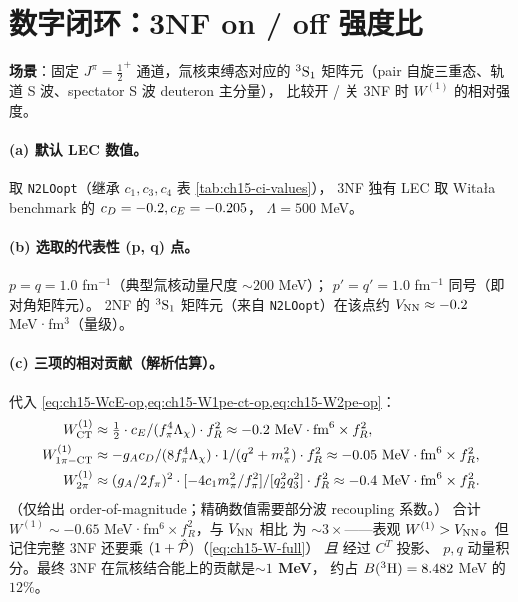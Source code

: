 \section{数字闭环：3NF on / off 强度比}
\label{sec:ch15-numerics}

\begin{numericalbox}[label={box:ch15-numerical-closure}]
\textbf{场景}：固定 \(J^\pi = \tfrac{1}{2}^+\) 通道，氚核束缚态对应的 \({}^3{\rm S}_1\)
矩阵元（pair 自旋三重态、轨道 S 波、spectator S 波 deuteron 主分量），
比较开 / 关 3NF 时 \(W^{(1)}\) 的相对强度。

\paragraph{(a) 默认 LEC 数值。}
取 \texttt{N2LOopt}（继承 \(c_1, c_3, c_4\) 表 \cref{tab:ch15-ci-values}），
3NF 独有 LEC 取 Witała benchmark 的 \(c_D = -0.2, c_E = -0.205\)，
\(\Lambda = 500\) MeV。

\paragraph{(b) 选取的代表性 (p, q) 点。}
\(p = q = 1.0\) fm\(^{-1}\)（典型氚核动量尺度 \(\sim 200\) MeV）；
\(p' = q' = 1.0\) fm\(^{-1}\) 同号（即对角矩阵元）。
2NF 的 \({}^3{\rm S}_1\) 矩阵元（来自 \texttt{N2LOopt}）在该点约
\(V_{\rm NN} \approx -0.2\) MeV·fm\(^3\)（量级）。

\paragraph{(c) 三项的相对贡献（解析估算）。}
代入 \cref{eq:ch15-WcE-op,eq:ch15-W1pe-ct-op,eq:ch15-W2pe-op}：
\begin{align}
W^{(1)}_{\rm CT}     & \approx \tfrac{1}{2} \cdot c_E / (f_\pi^4 \Lambda_\chi) \cdot f_R^2
                       \approx -0.2\text{ MeV}\cdot\text{fm}^6 \times f_R^2, \\
W^{(1)}_{1\pi-{\rm CT}} & \approx -g_A c_D/(8 f_\pi^4 \Lambda_\chi) \cdot 1/(q^2+m_\pi^2) \cdot f_R^2
                       \approx -0.05\text{ MeV}\cdot\text{fm}^6 \times f_R^2, \\
W^{(1)}_{2\pi}        & \approx (g_A/2f_\pi)^2 \cdot [-4c_1 m_\pi^2/f_\pi^2] / [q_2^2 q_3^2] \cdot f_R^2
                       \approx -0.4\text{ MeV}\cdot\text{fm}^6 \times f_R^2.
\end{align}
（仅给出 order-of-magnitude；精确数值需要部分波 recoupling 系数。）
合计 \(W^{(1)} \sim -0.65\) MeV·fm\(^6 \times f_R^2\)，与 \(V_{\rm NN}\) 相比
为 \(\sim 3 \times\)——表观 \(W^{(1)} > V_{\rm NN}\)。但记住完整 3NF
还要乘 \((1 + \hat{\mathcal{P}})\)（\cref{eq:ch15-W-full}） \emph{且} 经过 \(C^T\) 投影、
\(p, q\) 动量积分。最终 3NF 在氚核结合能上的贡献是\textbf{\(\sim 1\) MeV}，
约占 \(B(^3{\rm H}) = 8.482\) MeV 的 \(12\%\)。


\end{numericalbox}
